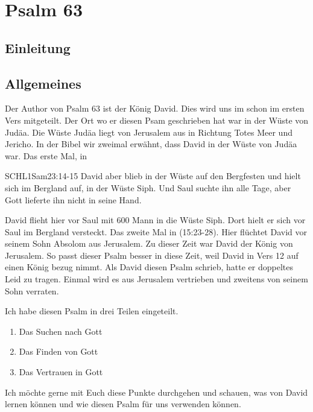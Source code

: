 \documentclass[14pt]{../../inc/mybib}
\author{Lothar Schmid}
\begin{document}
\setlength{\baselineskip}{1.5\baselineskip}

\section*{Psalm 63}
    \subsection{Einleitung}
    \subsection{Allgemeines}
    \begin{block}[Allgemeines]
    Der Author von Psalm 63 ist der König David. Dies wird uns im schon im ersten Vers mitgeteilt. Der Ort wo er diesen Psam geschrieben hat war in der Wüste von Judäa. Die Wüste Judäa liegt von Jerusalem aus in Richtung Totes Meer und Jericho. In der Bibel wir zweimal erwähnt, dass David in der Wüste von Judäa war. Das erste Mal, in     
    \begin{bibelbox}{SCHL}{1Sam}{23:14-15}
        David aber blieb in der Wüste auf den Bergfesten und hielt sich im Bergland auf, in der Wüste Siph. Und Saul suchte ihn alle Tage, aber Gott lieferte ihn nicht in seine Hand.
    \end{bibelbox}    
    David flieht hier vor Saul mit 600 Mann in die Wüste Siph. Dort hielt er sich vor Saul im Bergland versteckt. Das zweite Mal in (15:23-28). Hier flüchtet David vor seinem Sohn Absolom aus Jerusalem. Zu dieser Zeit war David der König von Jerusalem. So passt dieser Psalm besser in diese Zeit, weil David in Vers 12 auf einen König bezug nimmt. Als David diesen Psalm schrieb, hatte er doppeltes Leid zu tragen. Einmal wird es aus Jerusalem vertrieben und zweitens von seinem Sohn verraten.
    \end{block}
    \begin{block}
        Ich habe diesen Psalm in drei Teilen eingeteilt. 
        \begin{enumerate}
            \item Das Suchen nach Gott 
            \item Das Finden von Gott 
            \item Das Vertrauen in Gott 
        \end{enumerate}
        Ich möchte gerne mit Euch diese Punkte durchgehen und schauen, was  von David lernen können und wie  diesen Psalm für uns verwenden können.
    \end{block}
\end{document}
